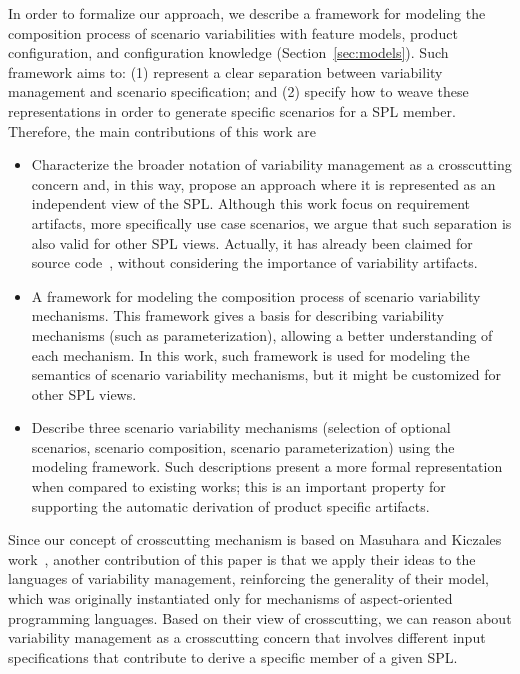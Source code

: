 \documentclass{acm_proc_article-sp}
\begin{document}
In order to formalize our approach, we describe 
a framework for modeling the composition process of scenario variabilities with feature models, product configuration, and configuration knowledge (Section~\ref{sec:models}). 
Such framework aims to: (1) represent a clear separation between variability management 
and scenario specification; and (2) specify how to weave these representations in order to generate
specific scenarios for a SPL member. Therefore, the main contributions of this work are

\begin{itemize}

\item Characterize the broader notation of variability management as a crosscutting concern and, in this way, propose an approach where it is  represented as an independent view of the SPL. Although this work focus on requirement artifacts, 
more specifically use case scenarios, we argue that such separation is also valid for other SPL views. Actually,
it has already been claimed for source code~\cite{alves-gpce-06, apel-icse2006}, without considering the importance of variability artifacts.  
  
\item A framework for modeling the composition process of scenario variability mechanisms. 
This framework gives a basis for describing variability mechanisms (such as parameterization), 
allowing a better understanding of each mechanism. In this work, such framework is used for modeling 
the semantics of scenario variability mechanisms, but it might be customized for other SPL views.

\item Describe three scenario variability mechanisms (selection of optional scenarios, scenario composition, scenario parameterization) 
using the modeling framework. Such descriptions present
a more formal representation when compared to existing works; this is an
important property for supporting the automatic derivation of product
specific artifacts.

\end{itemize}

Since our concept of crosscutting mechanism is based on Masuhara and Kiczales work~\cite{kiczales-ecoop-2003}, another 
contribution of this paper is that we apply their ideas to the languages of variability management,  reinforcing the generality of their model, which was originally instantiated only for mechanisms of aspect-oriented programming languages. Based on their view of crosscutting, we can reason about variability management as a crosscutting concern that involves different input specifications that contribute to derive a specific member of a 
given SPL. 
\end{document}
